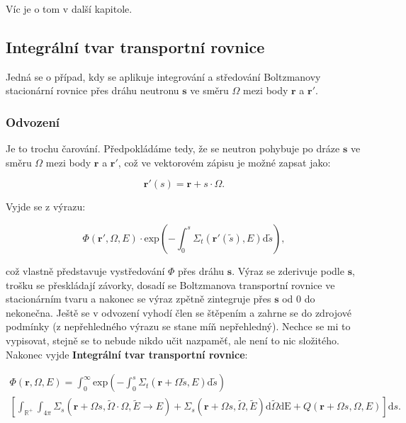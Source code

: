 Víc je o tom v další kapitole.

\subsection{Integrální tvar transportní rovnice}

Jedná se o případ, kdy se aplikuje integrování a středování Boltzmanovy stacionární rovnice přes dráhu neutronu $\textbf{s}$ ve směru $\Omega$ mezi body $\textbf{r}$ a $\textbf{r}'$. 

\subsubsection{Odvození}

Je to trochu čarování. Předpokládáme tedy, že se neutron pohybuje po dráze $\textbf{s}$ ve směru $\Omega$ mezi body $\textbf{r}$ a $\textbf{r}'$, což ve vektorovém zápisu je možné zapsat jako:

$$\textbf{r}'(s) = \textbf{r} + s \cdot \Omega. $$
  
Vyjde se z výrazu:

$$\Phi(\textbf{r}', \Omega, E) \cdot \text{exp} \left ( -\int_0^s \Sigma_t(\textbf{r}'(\tilde{s}), E) \text{d} \tilde{s} \right ),$$
  
což vlastně představuje vystředování $\Phi$ přes dráhu $\textbf{s}$. Výraz se zderivuje podle $\textbf{s}$, trošku se přeskládají závorky, dosadí se Boltzmanova transportní rovnice ve stacionárním tvaru a nakonec se výraz zpětně zintegruje přes $\textbf{s}$ od 0 do nekonečna. Ještě se v odvození vyhodí člen se štěpením a zahrne se do zdrojové podmínky (z nepřehledného výrazu se stane míň nepřehledný). Nechce se mi to vypisovat, stejně se to nebude nikdo učit nazpaměť, ale není to nic složitého. Nakonec vyjde \textbf{Integrální tvar transportní rovnice}:

\begin{equation}
  \boxed{
  \begin{multlined}
    \Phi(\textbf{r}, \Omega, E) = \int_0^\infty \text{exp} \left ( -\int_0^s \Sigma_t(\textbf{r} + \Omega \tilde{s}, E) \text{d} \tilde{s} \right ) \\
    \left [ \int_\mathbb{R^+} \int_{4 \pi}  \Sigma_s(\textbf{r} + \Omega s, \tilde{\Omega} \cdot \Omega, \tilde{E} \rightarrow E) + \Sigma_s(\textbf{r} + \Omega s, \tilde{\Omega}, \tilde{E}) \text{d}\tilde{\Omega} \text{d}\text{E} + Q(\textbf{r} + \Omega s, \Omega, E) \right ] \text{d}s.
  \end{multlined}}
  \label{integralni_transportka}
\end{equation}

